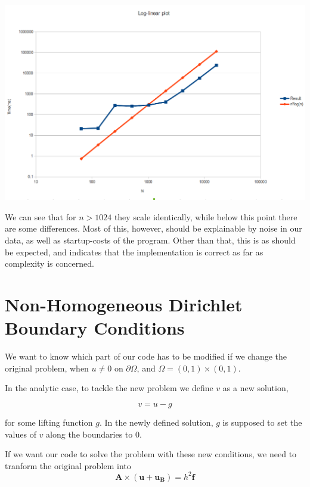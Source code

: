 \documentclass[fontsize=11pt,paper=a4,titlepage]{article}
\begin{document}
\hspace*{-1cm}\includegraphics[scale=0.55]{pics/logplot.png}

We can see that for $n>1024$ they scale identically, while below this point there are some differences. Most of this, however, should be explainable by noise in our data, as well as startup-costs of the program. Other than that, this is as should be expected, and indicates that the implementation is correct as far as complexity is concerned. 

\section{Non-Homogeneous Dirichlet Boundary Conditions}

We want to know which part of our code has to be modified if we change the
original problem, when $u \neq 0$ on $\partial\Omega$, and $\Omega = (0,1)
\times (0,1)$.

In the analytic case, to tackle the new problem we define $v$ as a new solution,

\begin{equation}
	v = u - g
\end{equation}

for some lifting function $g$. In the newly defined solution, $g$ is supposed to
set the values of $v$ along the boundaries to $0$.

If we want our code to solve the problem with these new conditions, we need to
tranform the original problem into
\begin{displaymath}
	\mathbf{A} \times (\mathbf{u} + \mathbf{u_B}) = h^2 \mathbf{f}
\end{displaymath}
\end{document}
